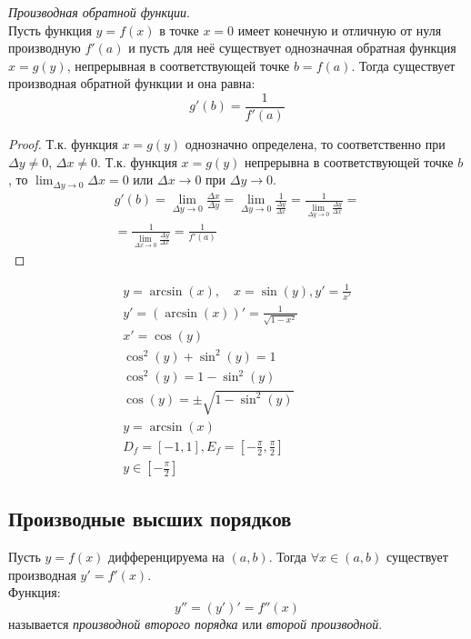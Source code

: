 \begin{theorem}
  \textit{Производная обратной функции}. \\
  Пусть функция $y = f(x)$ в точке $x = 0$ имеет конечную и отличную от нуля производную  $f'(a)$ и пусть для неё существует однозначная обратная функция $x = g(y)$, непрерывная в соответствующей точке $b = f(a)$.
  Тогда существует производная обратной функции и она равна:  \[
    \boxed{g'(b) = \frac{1}{f'(a)}}
  \] 
\end{theorem}
\begin{proof}
  Т.к. функция $x = g(y)$ однозначно определена, то соответственно при  $\Delta y \neq 0$, $\Delta x \neq 0$.
  Т.к. функция $x = g(y)$ непрерывна в соответствующей точке $b$, то  $\lim_{\Delta y \to 0} \Delta x = 0$ или $\Delta x \to 0$ при $\Delta y \to 0$.
  \begin{gather*}
    g'(b) = \lim_{\Delta y \to 0} \frac{\Delta x}{\Delta y} = \lim_{\Delta y \to 0} \frac{1}{\frac{\Delta y}{\Delta x}} = \frac{1}{\lim_{\Delta y \to 0} \frac{\Delta y}{\Delta x}} = \\
    = \frac{1}{\lim_{\Delta x \to 0} \frac{\Delta y}{\Delta x}} = \frac{1}{f'(a)}
  \end{gather*}
\end{proof}

\begin{eg}
  \begin{gather*}
    y = \arcsin(x), \quad x = \sin(y), y' = \frac{1}{x'} \\
    y'= (\arcsin(x))' = \frac{1}{\sqrt{1 - x^2}} \\
    x' = \cos(y) \\
    \cos^2(y) + \sin^2(y) = 1 \\
    \cos^2(y) = 1 - \sin^2(y) \\
    \cos(y) = \pm \sqrt{1 - \sin^2(y)} \\
    y = \arcsin(x) \\
    D_f = [-1, 1], E_f = [-\frac{\pi}{2}, \frac{\pi}{2}] \\
    y \in  [-\frac{\pi}{2}]
  \end{gather*}
\end{eg}

\subsection{Производные высших порядков}

Пусть $y = f(x)$ дифференцируема на  $(a, b)$. Тогда  $\forall x \in (a,b)$ существует производная $y'=f'(x)$. \\
Функция: \[
  y'' = \left( y' \right)' = f''(x)
\]
называется \textit{производной второго порядка} или \textit{второй производной}.

